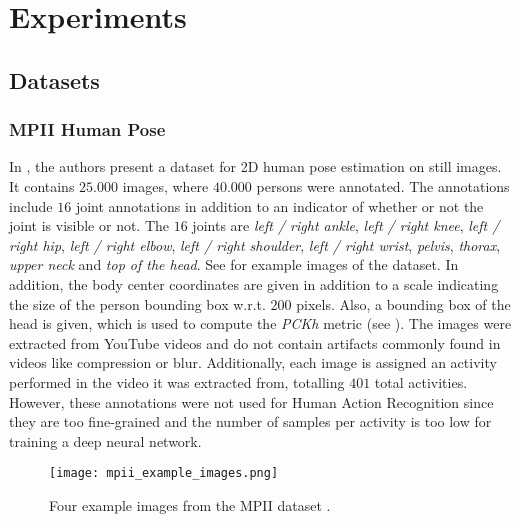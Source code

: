 \chapter{Experiments}

\section{Datasets}
\label{sec:exp-datasets}

\subsection{MPII Human Pose}
\label{sec:exp-mpii}

In \cite{andriluka_2d_2014}, the authors present a dataset for 2D human pose estimation on still images.
It contains $25.000$ images, where $40.000$ persons were annotated.
The annotations include $16$ joint annotations in addition to an indicator of whether or not the joint is visible or not.
The $16$ joints are \textit{left / right ankle}, \textit{left / right knee}, \textit{left / right hip}, \textit{left / right elbow}, \textit{left / right shoulder}, \textit{left / right wrist}, \textit{pelvis}, \textit{thorax}, \textit{upper neck} and \textit{top of the head}.
See  for example images of the dataset.
In addition, the body center coordinates are given in addition to a scale indicating the size of the person bounding box w.r.t. $200$ pixels.
Also, a bounding box of the head is given, which is used to compute the \textit{PCKh} metric (see ).
The images were extracted from YouTube videos and do not contain artifacts commonly found in videos like compression or blur.
Additionally, each image is assigned an activity performed in the video it was extracted from, totalling $401$ total activities.
However, these annotations were not used for Human Action Recognition since they are too fine-grained and the number of samples per activity is too low for training a deep neural network.

\begin{figure}[htb!]
    \centering
    \texttt{[image: mpii\_example\_images.png]}
    \caption{Four example images from the MPII dataset \cite{andriluka_2d_2014}. }
    \label{fig:mpii_example_images}
\end{figure}

